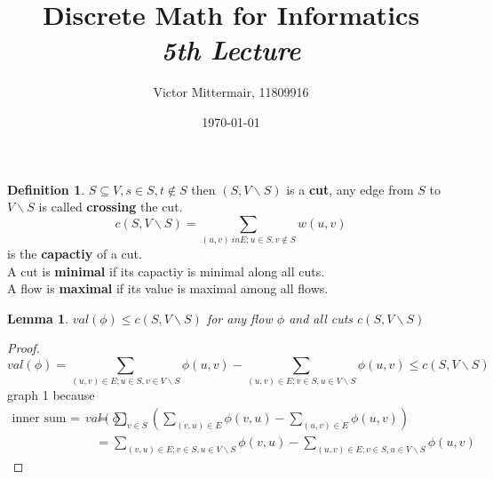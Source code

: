 \documentclass{article}
\author{Victor Mittermair, 11809916}
\title{Discrete Math for Informatics\\
        \Large \emph{5th Lecture}}
\date{\today} %
\newtheorem*{lemma}{Lemma}
\theoremstyle{definition}
\newtheorem*{definition}{Definition}
\theoremstyle{remark}
\begin{document}
\maketitle
\thispagestyle{firstpage}


\begin{comment}
\section*{Graph}
\begin{tikzpicture}[node distance={30mm}, thick, main/.style = {draw, circle}]
    \centering
    \node[main] (1)              {}; 
    \node[main] (2) [right of=1] {};
    \node[main] (3) [below of=1] {}; 
    \node[main] (4) [right of=3] {};
    \draw (1) -- (2) ; 
    \draw (1) -- (3); 
    \draw (2) -- (4); 
    \draw (3) -- (4);
    \draw (3) -- (2) node [midway, fill=white] {$e$}; 
\end{tikzpicture}
\end{comment}
\begin{definition}
  $S \subseteq V, s \in S , t \notin S$ then $(S, V \backslash S)$ is a \textbf{cut}, any edge from $S$ to $V\backslash S$ is called \textbf{crossing} the cut.
  $$c(S, V\backslash S) = \sum_{(u,v) \ in E ; u\in S, v\notin S} w(u,v)$$ is the \textbf{capactiy} of a cut.\\
  A cut is \textbf{minimal} if its capactiy is minimal along all cuts.\\
  A flow is \textbf{maximal} if its value is maximal among all flows.
\end{definition}
\begin{lemma}
  $val(\phi) \leq c(S,V\backslash S)$ for any flow $\phi$ and all cuts $c(S, V\backslash S)$ 
\end{lemma}
\begin{proof}
  \begin{equation*}
    val(\phi) = \sum_{(u,v) \in E; u\in S, v\in V \backslash S}\phi(u,v) - \sum_{(u,v) \in E; v\in S, u\in V \backslash S}\phi(u,v) \leq c(S, V \backslash S)
  \end{equation*}
  graph 1
  because $$ \begin{aligned} \text{inner sum = 0 if s = v} val(\phi) &= \sum_{v\in S} (\sum_{(v,u) \in E}\phi(v,u) - \sum_{(u,v) \in E} \phi(u,v)) \\
    &= \sum_{(v,u) \in E; v\in S, u\in V \backslash S}\phi(v,u) - \sum_{(u,v) \in E; v\in S,u\in V \backslash S}\phi(u,v)
  \end{aligned}$$
  
\end{proof}
\end{document}
